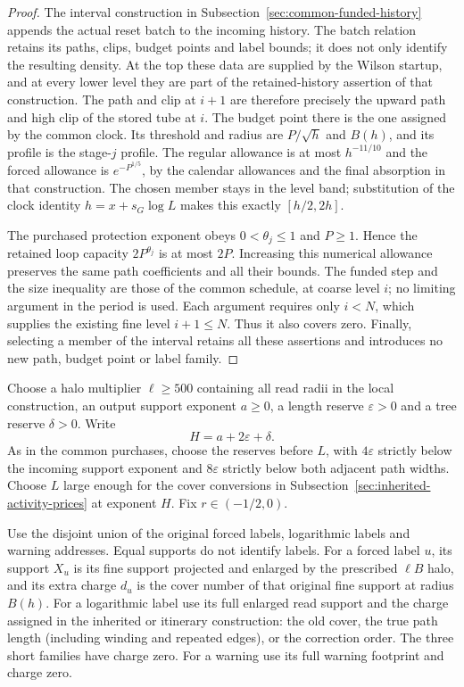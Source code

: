 \begin{proof}
The interval construction in Subsection~\ref{sec:common-funded-history}
appends the actual reset batch to the incoming history. The batch relation
retains its paths, clips, budget points and label bounds; it does not
only identify the resulting density. At the top these data are supplied
by the Wilson startup, and at every lower level they are part of the
retained-history assertion of that construction. The path and clip at
$i+1$ are therefore precisely the upward path and high clip of the
stored tube at $i$. The budget point there is the one assigned by the
common clock. Its threshold and radius are $P/\sqrt h$ and $B(h)$,
and its profile is the stage-$j$ profile. The regular allowance is at
most $h^{-11/10}$ and the forced allowance is $e^{-P^{1/5}}$, by the
calendar allowances and the final absorption in that construction.
The chosen member stays in the level band; substitution of the clock
identity $h=x+s_G\log L$ makes this exactly $[h/2,2h]$.

The purchased protection exponent obeys $0<\theta_j\le1$ and $P\ge1$.
Hence the retained loop capacity $2P^{\theta_j}$ is at most $2P$.
Increasing this numerical allowance preserves the same path coefficients
and all their bounds. The funded step and the size inequality are those
of the common schedule, at coarse level $i$; no limiting argument in the
period is used. Each argument requires only $i<N$, which supplies the
existing fine level $i+1\le N$. Thus it also covers zero. Finally,
selecting a member of the interval retains all these assertions and
introduces no new path, budget point or label family.
\end{proof}

Choose a halo multiplier $\ell\ge500$ containing all read radii in the
local construction, an output support exponent $a\ge0$, a length
reserve $\varepsilon>0$ and a tree reserve $\delta>0$. Write
\[
                         H=a+2\varepsilon+\delta.
\]
As in the common purchases, choose the reserves before $L$, with
$4\varepsilon$ strictly below the incoming support exponent and
$8\varepsilon$ strictly below both adjacent path widths. Choose $L$
large enough for the cover conversions in
Subsection~\ref{sec:inherited-activity-prices} at exponent $H$.
Fix $r\in(-1/2,0)$.

Use the disjoint union of the original forced labels, logarithmic labels
and warning addresses. Equal supports do not identify labels. For a
forced label $u$, its support $X_u$ is its fine support projected and
enlarged by the prescribed $\ell B$ halo, and its extra charge $d_u$
is the cover number of that original fine support at radius $B(h)$.
For a logarithmic label use its full enlarged read support and the
charge assigned in the inherited or itinerary construction: the old
cover, the true path length (including winding and repeated edges),
or the correction order. The three short families have charge zero.
For a warning use its full warning footprint and charge zero.

